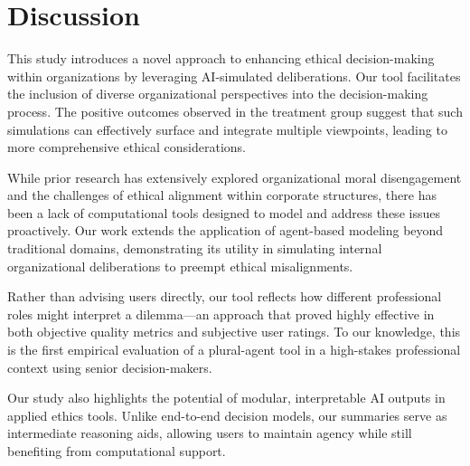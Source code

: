 \section{Discussion}

\begin{comment}
    Here you discuss how your results are: (1) in-line with previous work; and (2) differ
    (expand) on previous work. Also, you can list the limitations of your work (link to future work)

    (a) Which results match previous findings in the literature?
    (b) Which results differ from previous findings, and why
\end{comment}

This study introduces a novel approach to enhancing ethical decision-making within organizations by leveraging AI-simulated deliberations. Our tool facilitates the inclusion of diverse organizational perspectives into the decision-making process. The positive outcomes observed in the treatment group suggest that such simulations can effectively surface and integrate multiple viewpoints, leading to more comprehensive ethical considerations.

While prior research has extensively explored organizational moral disengagement and the challenges of ethical alignment within corporate structures, there has been a lack of computational tools designed to model and address these issues proactively. Our work extends the application of agent-based modeling beyond traditional domains, demonstrating its utility in simulating internal organizational deliberations to preempt ethical misalignments.

Rather than advising users directly, our tool reflects how different professional roles might interpret a dilemma—an approach that proved highly effective in both objective quality metrics and subjective user ratings. To our knowledge, this is the first empirical evaluation of a plural-agent tool in a high-stakes professional context using senior decision-makers.

Our study also highlights the potential of modular, interpretable AI outputs in applied ethics tools. Unlike end-to-end decision models, our summaries serve as intermediate reasoning aids, allowing users to maintain agency while still benefiting from computational support.
